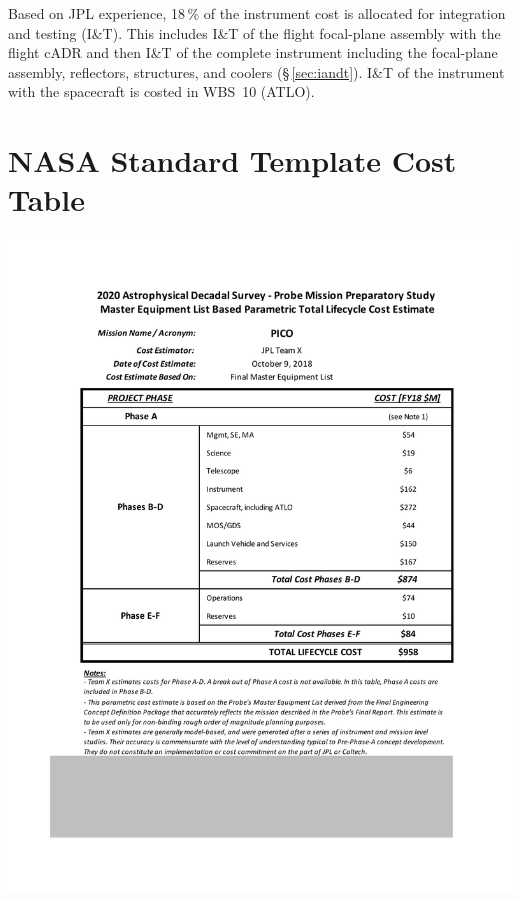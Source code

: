 Based on JPL experience, 18\,\% of the instrument cost is allocated for integration and testing (I\&T). This includes I\&T of the flight focal-plane assembly with the flight cADR and then I\&T of the complete instrument including the focal-plane assembly, reflectors, structures, and coolers (\S\,\ref{sec:iandt}). I\&T of the instrument with the spacecraft is costed in WBS~10 (ATLO).

\newpage


\section*{NASA Standard Template Cost Table}

\begin{centering}
\includegraphics{tables/PICO_Standard_Cost_Table.pdf}
\end{centering}
